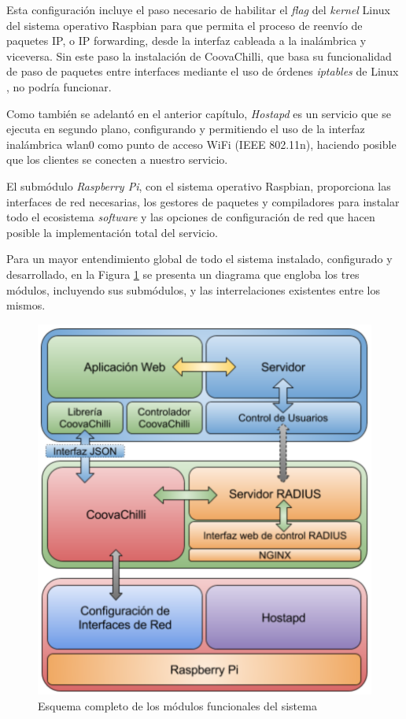 Esta configuración incluye el paso necesario de habilitar el \emph{flag} del \emph{kernel} Linux del sistema operativo Raspbian para que permita el proceso de reenvío de paquetes IP, o IP forwarding, desde la interfaz cableada a la inalámbrica y viceversa. Sin este paso la instalación de CoovaChilli, que basa su funcionalidad de paso de paquetes entre interfaces mediante el uso de órdenes \emph{iptables} de Linux \cite{TUNTAP2}, no podría funcionar.

Como también se adelantó en el anterior capítulo, \emph{Hostapd} es un servicio que se ejecuta en segundo plano, configurando y permitiendo el uso de la interfaz inalámbrica wlan0 como punto de acceso WiFi (IEEE 802.11n), haciendo posible que los clientes se conecten a nuestro servicio.

El submódulo \emph{Raspberry Pi}, con el sistema operativo Raspbian, proporciona las interfaces de red necesarias, los gestores de paquetes y compiladores para instalar todo el ecosistema \emph{software} y las opciones de configuración de red que hacen posible la implementación total del servicio.

Para un mayor entendimiento global de todo el sistema instalado, configurado y desarrollado, en la Figura \ref{modulosTotal} se presenta un diagrama que engloba los tres módulos, incluyendo sus submódulos, y las interrelaciones existentes entre los mismos.

\begin{figure}[!t]
\begin{center}
\includegraphics[width=0.75\linewidth]{./4_AnalisisFuncional/Img/modulosTotal.png}
\end{center}
\caption{Esquema completo de los módulos funcionales del sistema}
\label{modulosTotal}
\end{figure}